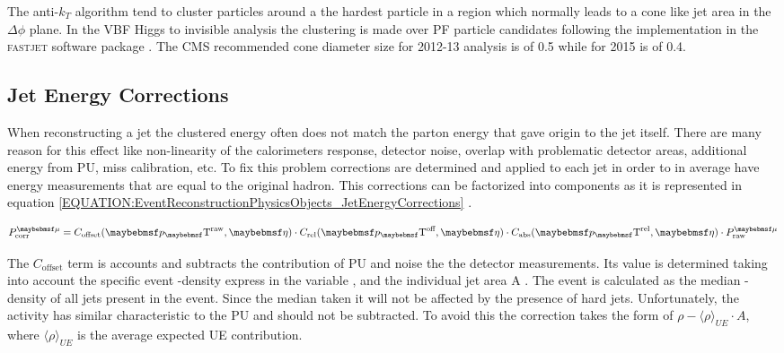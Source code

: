 The anti-$k_T$ algorithm tend to cluster particles around a the hardest particle in a region which normally leads to a cone like jet area in the $\Delta\phi$ plane. In the \gls{VBF} Higgs to invisible analysis the clustering is made over \gls{PF} particle candidates following the implementation in the \textsc{fastjet} software package \cite{ARTICLE:FastJetUserManual}. The \gls{CMS} recommended cone diameter size for 2012-13 analysis is of 0.5 while for 2015 is of 0.4.


\subsection{Jet Energy Corrections}
\label{SECTION:EventReconstructionPhysicsObjects_Jets_JetEnergyCorrections}


When reconstructing a jet the clustered energy often does not match the parton energy that gave origin to the jet itself. There are many reason for this effect like non-linearity of the calorimeters response, detector noise, overlap with problematic detector areas, additional energy from \gls{PU}, miss calibration, etc. To fix this problem corrections are determined and applied to each jet in order to in average have energy measurements that are equal to the original hadron. This corrections can be factorized into components as it is represented in equation \ref{EQUATION:EventReconstructionPhysicsObjects_JetEnergyCorrections} \cite{ARTICLE:CMSDeterminationJetEnergyCalibration}.

\begin{equation}
P_{\text{corr}}^{\mu} = C_{\text{offset}}(\pT^{\text{raw}},\eta) \cdot C_{\text{rel}}(\pT^{\text{off}},\eta) \cdot C_{\text{abs}}(\pT^{\text{rel}},\eta) \cdot P_{\text{raw}}^{\mu}
\label{EQUATION:EventReconstructionPhysicsObjects_JetEnergyCorrections}
\end{equation}

The $C_{\text{offset}}$ term is accounts and subtracts the contribution of \gls{PU} and noise the the detector measurements. Its value is determined taking into account the specific event \pt-density express in the variable \rho, and the individual jet area A \cite{ARTICLE:PileupSubtractionJetAreas}. The event \rho is calculated as the median \pt-density of all jets present in the event. Since the median taken it will not be affected by the presence of hard jets. Unfortunately, the  activity has similar characteristic to the \gls{PU} and should not be subtracted. To avoid this the correction takes the form of $\rho - \langle \rho \rangle_{UE} \cdot A$, where $\langle \rho \rangle_{UE}$ is the average expected \gls{UE} contribution.

